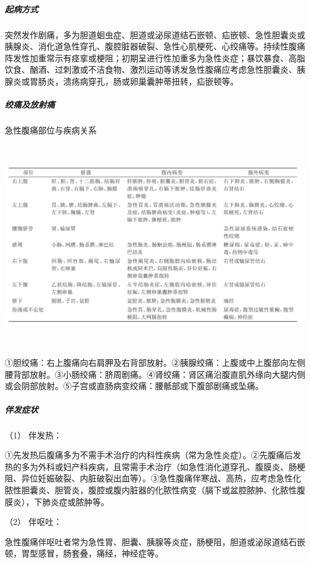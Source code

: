 \subparagraph{起病方式}

突然发作剧痛，多为胆道蛔虫症、胆道或泌尿道结石嵌顿、疝嵌顿、急性胆囊炎或胰腺炎、消化道急性穿孔、腹腔脏器破裂、急性心肌梗死、心绞痛等。持续性腹痛阵发性加重常示有痉挛或梗阻；初期呈进行性加重多为急性炎症；暴饮暴食、高脂饮食、酗酒、过刺激或不洁食物、激烈运动等诱发急性腹痛应考虑急性胆囊炎、胰腺炎或胃肠炎，溃疡病穿孔，肠或卵巢囊肿蒂扭转，疝嵌顿等。

\subparagraph{绞痛及放射痛}

\begin{table}[htbp]
\centering
\caption{急性腹痛部位与疾病关系}
\label{tab10-2}
\includegraphics[width=6.71875in,height=3.52083in]{./images/Image00051.jpg}
\end{table}

①胆绞痛：右上腹痛向右肩胛及右背部放射。②胰腺绞痛：上腹或中上腹部向左侧腰背部放射。③小肠绞痛：脐周剧痛。④肾绞痛：肾区痛沿腹直肌外缘向大腿内侧或会阴部放射。⑤子宫或直肠病变绞痛：腰骶部或下腹部剧痛或坠痛。

\subparagraph{伴发症状}

\hypertarget{text00026.htmlux5cux23CHP1-10-2-1-4-3-1}{}
（1） 伴发热：

①先发热后腹痛多为不需手术治疗的内科性疾病（常为急性炎症）。②先腹痛后发热的多为外科或妇产科疾病，且常需手术治疗（如急性消化道穿孔、腹膜炎、肠梗阻、异位妊娠破裂、内脏破裂出血等）。③急性腹痛伴寒战、高热，应考虑急性化脓性胆囊炎、胆管炎，腹腔或腹内脏器的化脓性病变（膈下或盆腔脓肿、化脓性腹膜炎），下肺炎症或脓肿等。

\hypertarget{text00026.htmlux5cux23CHP1-10-2-1-4-3-2}{}
（2） 伴呕吐：

急性腹痛伴呕吐者常为急性胃、胆囊、胰腺等炎症，肠梗阻，胆道或泌尿道结石嵌顿，胃型感冒，肠套叠，痛经，神经症等。

